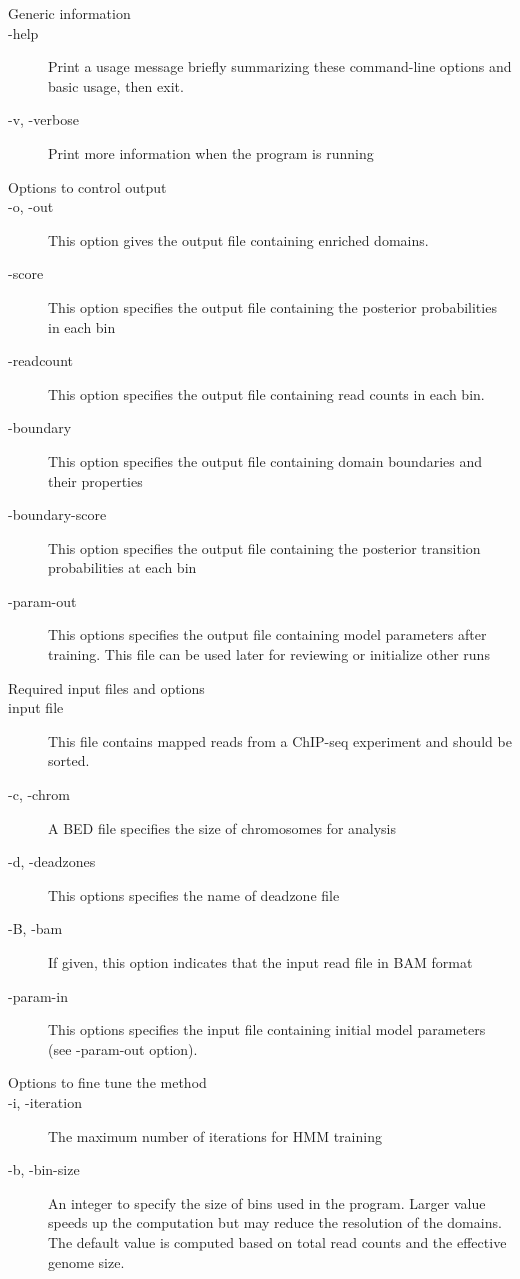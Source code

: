 \documentclass[11pt]{report}
\begin{document}
\begin{description}
\item[Generic information]
\item[-help] Print a usage message briefly summarizing these
  command-line options and basic usage, then exit.
\item[-v, -verbose] Print more information when the program is running
\item[Options to control output]
\item[-o, -out] This option gives the output file containing enriched domains.
\item[-score] This option specifies the output file containing the posterior
  probabilities in each bin
\item[-readcount] This option specifies the output file containing read counts
  in each bin.
\item[-boundary] This option specifies the output file containing domain
  boundaries and their properties
\item[-boundary-score] This option specifies the output file containing the
  posterior transition probabilities at each bin
\item[-param-out] This options specifies the output file containing model
  parameters after training. This file can be used later for reviewing or
  initialize other runs
\item[Required input files and options]
\item[input file] This file contains mapped reads from a
  ChIP-seq experiment and should be sorted.
\item[-c, -chrom] A BED file specifies the size of chromosomes for
  analysis
\item[-d, -deadzones] This options specifies the name of deadzone
  file
\item[-B, -bam] If given, this option indicates that the input read file in BAM
  format
\item[-param-in] This options specifies the input file containing initial model
  parameters (see -param-out option).
\item[Options to fine tune the method]
\item[-i, -iteration] The maximum number of iterations for HMM
  training
\item[-b, -bin-size] An integer to specify the size of bins used in
  the program. Larger value speeds up the computation but may reduce
  the resolution of the domains. The default value is computed based
  on total read counts and the effective genome size.

\end{description}
\end{document}
